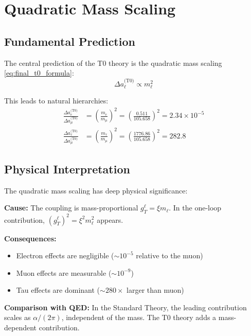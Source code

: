 	\section{Quadratic Mass Scaling}
	
	\subsection{Fundamental Prediction}
	
	The central prediction of the T0 theory is the quadratic mass scaling \eqref{eq:final_t0_formula}:
	\begin{equation}
		\Delta a_\ell^{\text{(T0)}} \propto m_\ell^2
		\label{eq:quadratic_scaling}
	\end{equation}
	
	This leads to natural hierarchies:
	\begin{align}
		\frac{\Delta a_e^{\text{(T0)}}}{\Delta a_\mu^{\text{(T0)}}} 
		&= \left(\frac{m_e}{m_\mu}\right)^2 
		= \left(\frac{0.511}{105.658}\right)^2 
		= 2.34 \times 10^{-5} \label{eq:electron_muon_ratio} \\
		\frac{\Delta a_\tau^{\text{(T0)}}}{\Delta a_\mu^{\text{(T0)}}} 
		&= \left(\frac{m_\tau}{m_\mu}\right)^2 
		= \left(\frac{1776.86}{105.658}\right)^2 
		= 282.8 \label{eq:tau_muon_ratio}
	\end{align}
	
	\subsection{Physical Interpretation}
	
	The quadratic mass scaling has deep physical significance:
	
	\textbf{Cause:} The coupling is mass-proportional $g_T^\ell = \xi m_\ell$. In the one-loop contribution, $(g_T^\ell)^2 = \xi^2 m_\ell^2$ appears.
	
	\textbf{Consequences:}
	\begin{itemize}
		\item Electron effects are negligible ($\sim 10^{-5}$ relative to the muon)
		\item Muon effects are measurable ($\sim 10^{-9}$)
		\item Tau effects are dominant ($\sim 280 \times$ larger than muon)
	\end{itemize}
	
	\textbf{Comparison with QED:} In the Standard Theory, the leading contribution scales as $\alpha/(2\pi)$, independent of the mass. The T0 theory adds a mass-dependent contribution.
	

